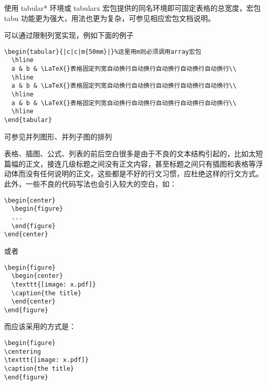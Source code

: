 
使用 tabular* 环境或 tabularx
宏包提供的同名环境即可固定表格的总宽度，宏包 tabu
功能更为强大，用法也更为复杂，可参见相应宏包文档说明。



可以通过限制列宽实现，例如下面的例子

\begin{verbatim}
\begin{tabular}{|c|c|m{50mm}|}%这里用m则必须调用array宏包
  \hline
  a & b & \LaTeX{}表格固定列宽自动换行自动换行自动换行自动换行自动换行\\
  \hline
  a & b & \LaTeX{}表格固定列宽自动换行自动换行自动换行自动换行自动换行\\
  \hline
  a & b & \LaTeX{}表格固定列宽自动换行自动换行自动换行自动换行自动换行\\
  \hline
\end{tabular}
\end{verbatim}



可参见并列图形、并列子图的排列



表格、插图、公式、列表的前后空白很多是由于不良的文本结构引起的，比如太短篇幅的正文，接连几级标题之间没有正文内容，甚至标题之间只有插图和表格等浮动体而没有任何说明的正文，这些都是不好的行文习惯，应杜绝这样的行文方式。此外，一些不良的代码写法也会引入较大的空白，如：

\begin{verbatim}
\begin{center}
  \begin{figure}
  ...
  \end{figure}
\end{center}
\end{verbatim}

或者

\begin{verbatim}
\begin{figure}
  \begin{center}
  \texttt{[image: x.pdf]}
  \caption{the title}
  \end{center}
\end{figure}
\end{verbatim}

而应该采用的方式是：

\begin{verbatim}
\begin{figure}
\centering
\texttt{[image: x.pdf]}
\caption{the title}
\end{figure}
\end{verbatim}

